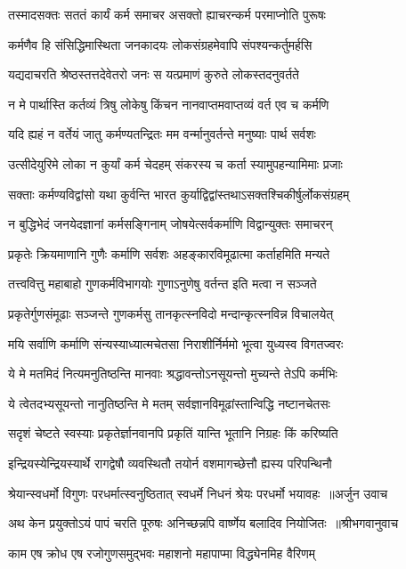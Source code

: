 \twolineshloka
{तस्मादसक्तः सततं कार्यं कर्म समाचर}
{असक्तो ह्याचरन्कर्म परमाप्नोति पुरूषः}


\twolineshloka
{कर्मणैव हि संसिद्धिमास्थिता जनकादयः}
{लोकसंग्रहमेवापि संपश्यन्कर्तुमर्हसि}


\twolineshloka
{यद्यदाचरति श्रेष्ठस्तत्तदेवेतरो जनः}
{स यत्प्रमाणं कुरुते लोकस्तदनुवर्तते}


\twolineshloka
{न मे पार्थास्ति कर्तव्यं त्रिषु लोकेषु किंचन}
{नानवाप्तमवाप्तव्यं वर्त एव च कर्मणि}


\twolineshloka
{यदि ह्यहं न वर्तेयं जातु कर्मण्यतन्द्रितः}
{मम वर्न्मानुवर्तन्ते मनुष्याः पार्थ सर्वशः}


\twolineshloka
{उत्सीदेयुरिमे लोका न कुर्यां कर्म चेदहम्}
{संकरस्य च कर्ता स्यामुपहन्यामिमाः प्रजाः}


\twolineshloka
{सक्ताः कर्मण्यविद्वांसो यथा कुर्वन्ति भारत}
{कुर्याद्विद्वांस्तथाऽसक्तश्चिकीर्षुर्लोकसंग्रहम्}


\twolineshloka
{न बुद्धिभेदं जनयेदज्ञानां कर्मसङ्गिनाम्}
{जोषयेत्सर्वकर्माणि विद्वान्युक्तः समाचरन्}


\twolineshloka
{प्रकृतेः क्रियमाणानि गुणैः कर्माणि सर्वशः}
{अहङ्कारविमूढात्मा कर्ताहमिति मन्यते}


\twolineshloka
{तत्त्ववित्तु महाबाहो गुणकर्मविभागयोः}
{गुणाऽनुणेषु वर्तन्त इति मत्वा न सञ्जते}


\twolineshloka
{प्रकृतेर्गुणसंमूढाः सञ्जन्ते गुणकर्मसु}
{तानकृत्स्नविदो मन्दान्कृत्स्नविन्न विचालयेत्}


\twolineshloka
{मयि सर्वाणि कर्माणि संन्यस्याध्यात्मचेतसा}
{निराशीर्निर्ममो भूत्वा युध्यस्व विगतज्वरः}


\twolineshloka
{ये मे मतमिदं नित्यमनुतिष्ठन्ति मानवाः}
{श्रद्धावन्तोऽनसूयन्तो मुच्यन्ते तेऽपि कर्मभिः}


\twolineshloka
{ये त्वेतदभ्यसूयन्तो नानुतिष्ठन्ति मे मतम्}
{सर्वज्ञानविमूढांस्तान्विद्धि नष्टानचेतसः}


\twolineshloka
{सदृशं चेष्टते स्वस्याः प्रकृतेर्ज्ञानवानपि}
{प्रकृतिं यान्ति भूतानि निग्रहः किं करिष्यति}


\twolineshloka
{इन्द्रियस्येन्द्रियस्यार्थे रागद्वेषौ व्यवस्थितौ}
{तयोर्न वशमागच्छेत्तौ ह्यस्य परिपन्थिनौ}


\threelineshloka
{श्रेयान्स्वधर्मो विगुणः परधर्मात्स्वनुष्ठितात्}
{स्वधर्मे निधनं श्रेयः परधर्मो भयावहः ॥अर्जुन उवाच}
{}


\threelineshloka
{अथ केन प्रयुक्तोऽयं पापं चरति पूरुषः}
{अनिच्छन्नपि वार्ष्णेय बलादिव नियोजितः ॥श्रीभगवानुवाच}
{}


\twolineshloka
{काम एष क्रोध एष रजोगुणसमुद्भवः}
{महाशनो महापाप्मा विद्ध्येनमिह वैरिणम्}


